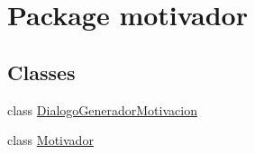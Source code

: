 \hypertarget{namespacemotivador}{}\section{Package motivador}
\label{namespacemotivador}
\subsection*{Classes}
\begin{DoxyCompactItemize}
\item 
class \mbox{\hyperlink{classmotivador_1_1_dialogo_generador_motivacion}{Dialogo\+Generador\+Motivacion}}
\item 
class \mbox{\hyperlink{classmotivador_1_1_motivador}{Motivador}}
\end{DoxyCompactItemize}
